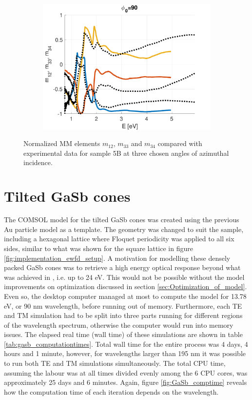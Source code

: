 \begin{figure}
   \begin{subfigure}{\linewidth}
        \centering
        \includegraphics[width=.49\linewidth, trim= 0cm 0cm 2cm 0cm, clip]{figures/ch4/S5B/NCS/S5B_NCS_phi90.pdf}
   \end{subfigure}
   \caption{Normalized MM elements $m_{12}$, $m_{33}$ and $m_{34}$ compared with experimental data for sample 5B at three chosen angles of azimuthal incidence.}
   \label{fig:S5B_NCS}
\end{figure}



\section{Tilted GaSb cones}
\label{sec:results_gasb} %
The COMSOL model for the tilted GaSb cones was created using the previous Au particle model as a template. The geometry was changed to suit the sample, including a hexagonal lattice where Floquet periodicity was applied to all six sides, similar to what was shown for the square lattice in figure \ref{fig:implementation_ewfd_setup}. A motivation for modelling these densely packed GaSb cones was to retrieve a high energy optical response beyond what was achieved in \cite{gasbcones}, i.e. up to 24 eV. This would not be possible without the model improvements on optimization discussed in section \ref{sec:Optimization_of_model}. Even so, the desktop computer managed at most to compute the model for 13.78 eV, or 90 nm wavelength, before running out of memory. Furthermore, each TE and TM simulation had to be split into three parts running for different regions of the wavelength spectrum, otherwise the computer would run into memory issues. The elapsed real time (wall time) of these simulations are shown in table \ref{tab:gasb_computationtimes}. Total wall time for the entire process was 4 days, 4 hours and 1 minute, however, for wavelengths larger than 195 nm it was possible to run both TE and TM simulations simultaneously. The total CPU time, assuming the labour was at all times divided evenly among the 6 CPU cores, was approximately 25 days and 6 minutes. Again, figure \ref{fig:GaSb_comptime} reveals how the computation time of each iteration depends on the wavelength.

